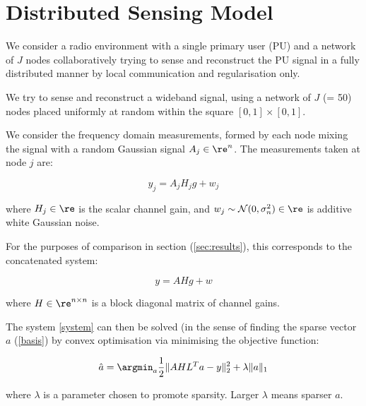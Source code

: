 \section{Distributed Sensing Model}\label{sec:sensingmodel}


We consider a radio environment with a single primary user (PU) and a network of \(J\) nodes collaboratively trying to sense and reconstruct the PU signal in a fully distributed manner by local communication and regularisation only.

We try to sense and reconstruct a wideband signal, using a network of \(J\) (= 50) nodes placed uniformly at random within the square \(  \left[0,1\right]\times \left[0,1\right] \). 

We consider the frequency domain measurements, formed by each node mixing the signal with a random Gaussian signal \(A_j \in \re^n\). The measurements taken at node \(j\) are:

\begin{equation}
y_j = A_jH_jg + w_j
\label{dist_system}
\end{equation}

where \(H_j \in \re\) is the scalar channel gain, and \(w_j \sim \mathcal{N}(0,\sigma^2_n) \in \re \) is additive white Gaussian noise. 

For the purposes of comparison in section (\ref{sec:results}), this corresponds to the concatenated system:

\begin{equation}
y = AHg + w
\label{system}
\end{equation}

where \(H \in \re^{n \times n}\) is a block diagonal matrix of channel gains.

The system  \ref{system} can then be solved (in the sense of finding the sparse vector \(a\) (\ref{basis}) by convex optimisation via minimising the objective function:

\begin{equation}
\hat{a} = \argmin_{a} \frac{1}{2}\|AHL^{T}a-y\|_2^2 + \lambda \|a\|_1
\label{opt}
\end{equation}

where \(\lambda\) is a parameter chosen to promote sparsity. Larger \(\lambda\) means sparser \(a\).